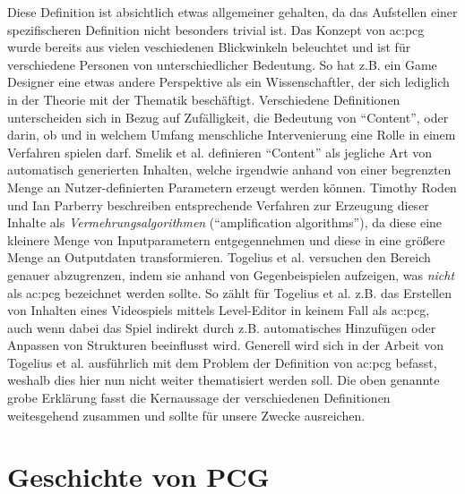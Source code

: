 Diese Definition ist absichtlich etwas allgemeiner gehalten, da das Aufstellen einer spezifischeren Definition nicht
besonders trivial ist. Das Konzept von \gls{ac:pcg} wurde bereits aus vielen veschiedenen Blickwinkeln beleuchtet und
ist für verschiedene Personen von unterschiedlicher Bedeutung. So hat z.B. ein Game Designer eine etwas andere Perspektive
als ein Wissenschaftler, der sich lediglich in der Theorie mit der Thematik beschäftigt. \cite{9_togelius_et_al}
Verschiedene Definitionen unterscheiden sich in Bezug auf Zufälligkeit, die Bedeutung von ``Content'', oder darin, ob und
in welchem Umfang menschliche Intervenierung eine Rolle in einem Verfahren spielen darf. Smelik et al. definieren ``Content''
als jegliche Art von automatisch generierten Inhalten, welche irgendwie anhand von einer begrenzten Menge an Nutzer-definierten
Parametern erzeugt werden können. \cite{26_smelik_et_al} Timothy Roden und Ian Parberry beschreiben entsprechende Verfahren zur
Erzeugung dieser Inhalte als \textit{Vermehrungsalgorithmen} (``amplification algorithms''), da diese eine kleinere Menge
von Inputparametern entgegennehmen und diese in eine größere Menge an Outputdaten transformieren. \cite{27_roden_parberry}
Togelius et al. \cite{9_togelius_et_al} versuchen den Bereich genauer abzugrenzen, indem sie anhand von Gegenbeispielen
aufzeigen, was \textit{nicht} als \gls{ac:pcg} bezeichnet werden sollte. So zählt für Togelius et al. z.B. das Erstellen von
Inhalten eines Videospiels mittels Level-Editor in keinem Fall als \gls{ac:pcg}, auch wenn dabei das Spiel indirekt durch z.B.
automatisches Hinzufügen oder Anpassen von Strukturen beeinflusst wird. Generell wird sich in der Arbeit
von Togelius et al. \cite{9_togelius_et_al} ausführlich mit dem Problem der Definition von \gls{ac:pcg} befasst, weshalb
dies hier nun nicht weiter thematisiert werden soll. Die oben genannte grobe Erklärung fasst die Kernaussage der verschiedenen
Definitionen weitesgehend zusammen und sollte für unsere Zwecke ausreichen.

\section{Geschichte von PCG}
